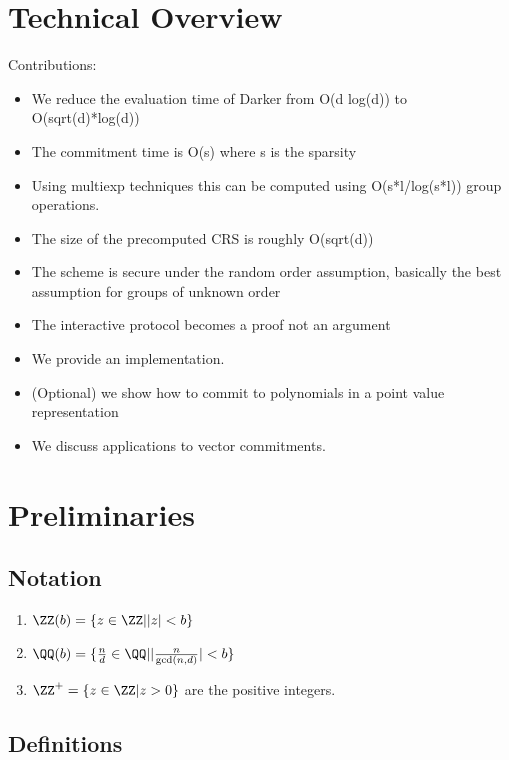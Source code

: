 

\section{Technical Overview}
Contributions:
\begin{itemize}
	\item We reduce the evaluation time of Darker from O(d log(d)) to O(sqrt(d)*log(d))
	\item The commitment time is O(s) where s is the sparsity 
	\item Using multiexp techniques this can be computed using O(s*l/log(s*l)) group operations. 
	\item The size of the precomputed CRS is roughly O(sqrt(d))
	\item The scheme is secure under the random order assumption, basically the best assumption for groups of unknown order
	\item The interactive protocol becomes a proof not an argument
	\item We provide an implementation.
	\item (Optional) we show how to commit to polynomials in a point value representation
	\item We discuss applications to vector commitments. 
\end{itemize}

\section{Preliminaries}
\subsection{Notation}
\begin{enumerate}
	\item $\ZZ(b)=\{ z \in \ZZ | |z|<b\}$
	\item $\QQ(b)=\{\frac{n}{d} \in \QQ | |\frac{n}{\gcd(n,d)}|< b\}$
	\item $\ZZ^+=\{z \in \ZZ | z>0\}$ are the positive integers.
	\end{enumerate}
	
\subsection{Definitions}